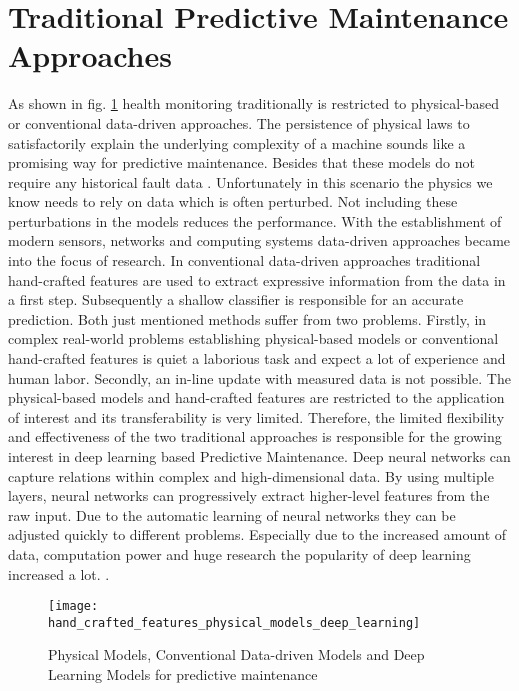 \section{Traditional Predictive Maintenance Approaches}
As shown in fig. \ref{fig:hand_crafted_features_physical_models_deep_learning} health monitoring traditionally is restricted to physical-based or conventional data-driven approaches. The persistence of  physical laws to satisfactorily explain the underlying complexity of a machine sounds like a promising way for predictive maintenance. Besides that these models do not require any historical fault data \cite{AN201942}. Unfortunately in this scenario the physics we know needs to rely on data which is often perturbed. Not including these perturbations in the models reduces the performance. With the establishment of modern sensors, networks and computing systems data-driven approaches became into the focus of research. In conventional data-driven approaches traditional hand-crafted features are used to extract expressive information from the data in a first step. Subsequently a shallow classifier is responsible for an accurate prediction. Both just mentioned methods suffer from two problems. Firstly, in complex real-world problems establishing physical-based models or conventional hand-crafted features is quiet a laborious task and expect a lot of experience and human labor. Secondly, an in-line update with measured data is not possible. The physical-based models and hand-crafted features are restricted to the application of interest and its transferability is very limited. Therefore, the limited flexibility and effectiveness of the two traditional approaches is responsible for the growing interest in deep learning based Predictive Maintenance. Deep neural networks can capture relations within complex and high-dimensional data. By using multiple layers, neural networks can progressively extract higher-level features from the raw input. Due to the automatic learning of neural networks they can be adjusted quickly to different problems. Especially due to the increased amount of data, computation power and huge research the popularity of deep learning increased a lot.  \cite{ZHAO2019213} \cite{AZAMFAR2020103932}. 

\begin{figure}[htpb]
  \centering
  \texttt{[image: hand\_crafted\_features\_physical\_models\_deep\_learning]}
  \caption {Physical Models, Conventional Data-driven Models and Deep Learning Models for predictive maintenance \cite{ZHAO2019213}} \label{fig:hand_crafted_features_physical_models_deep_learning}
\end{figure}

